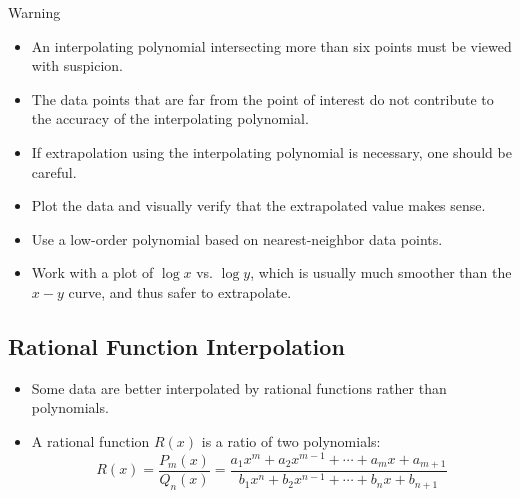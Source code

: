 \documentclass{beamer}
\begin{document}
\begin{frame}{Warning}
\begin{itemize}
\item An interpolating polynomial intersecting more than \alert{six points} must be viewed with suspicion. 
\item The data points that are far from the point of interest do not contribute to the accuracy of the interpolating polynomial. 
\item  If \alert{extrapolation} using the interpolating polynomial is necessary, one should be careful.
\item \alert{Plot the data} and visually verify that the extrapolated value makes sense. 
\item	Use a \alert{low-order polynomial} based on nearest-neighbor data points. 
\item Work with a plot of $\log x$ vs. $\log y$, which is usually much smoother than the $x-y$
curve, and thus safer to extrapolate.
\end{itemize}
\end{frame}
%
%
\subsection[Rational Function Interpolation]{Rational Function Interpolation}
\begin{frame}
\begin{itemize}
  \item   Some data are better interpolated by rational functions rather than polynomials.
  \item  A rational function $R(x)$ is a ratio of two polynomials:
  \[
    R(x) = \frac{P_m(x)}{Q_n(x)}=\frac{a_1 x^m+a_2 x^{m-1}+\cdots+a_m x+a_{m+1}}{b_1 x^n+b_2 x^{n-1}+\cdots+b_n x+b_{n+1}}
  \]
\end{itemize}
\end{frame}
\end{document}
